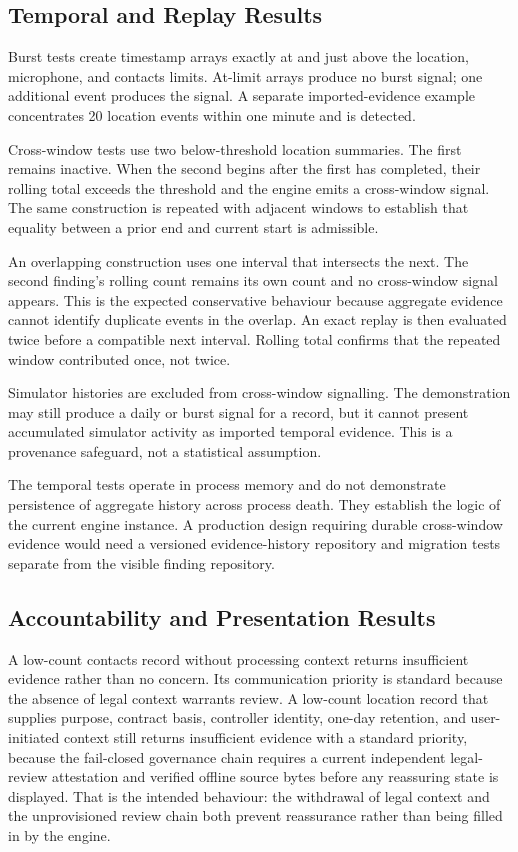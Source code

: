 \subsection{Temporal and Replay Results}

Burst tests create timestamp arrays exactly at and just above the location, microphone, and contacts limits. At-limit arrays produce no burst signal; one additional event produces the signal. A separate imported-evidence example concentrates 20 location events within one minute and is detected.

Cross-window tests use two below-threshold location summaries. The first remains inactive. When the second begins after the first has completed, their rolling total exceeds the threshold and the engine emits a cross-window signal. The same construction is repeated with adjacent windows to establish that equality between a prior end and current start is admissible.

An overlapping construction uses one interval that intersects the next. The second finding's rolling count remains its own count and no cross-window signal appears. This is the expected conservative behaviour because aggregate evidence cannot identify duplicate events in the overlap. An exact replay is then evaluated twice before a compatible next interval. Rolling total confirms that the repeated window contributed once, not twice.

Simulator histories are excluded from cross-window signalling. The demonstration may still produce a daily or burst signal for a record, but it cannot present accumulated simulator activity as imported temporal evidence. This is a provenance safeguard, not a statistical assumption.

The temporal tests operate in process memory and do not demonstrate persistence of aggregate history across process death. They establish the logic of the current engine instance. A production design requiring durable cross-window evidence would need a versioned evidence-history repository and migration tests separate from the visible finding repository.

\subsection{Accountability and Presentation Results}

A low-count contacts record without processing context returns insufficient evidence rather than no concern. Its communication priority is standard because the absence of legal context warrants review. A low-count location record that supplies purpose, contract basis, controller identity, one-day retention, and user-initiated context still returns insufficient evidence with a standard priority, because the fail-closed governance chain requires a current independent legal-review attestation and verified offline source bytes before any reassuring state is displayed. That is the intended behaviour: the withdrawal of legal context and the unprovisioned review chain both prevent reassurance rather than being filled in by the engine.

